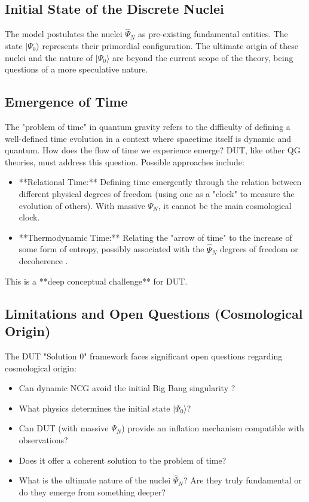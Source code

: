 \documentclass[11pt, a4paper]{article}
\theoremstyle{remark}
\newcommand{\Op}[1]{\hat{#1}}
\begin{document}
\subsection{Initial State of the Discrete Nuclei}
\label{subsec:initial_state_nuclei_final}
The model postulates the nuclei \( \hat{\Psi}_N \) as pre-existing fundamental entities. The state \( |\Psi_0\rangle \) represents their primordial configuration. The ultimate origin of these nuclei and the nature of \( |\Psi_0\rangle \) are beyond the current scope of the theory, being questions of a more speculative nature.

\subsection{Emergence of Time}
\label{subsec:time_emergence_final}
The "problem of time" in quantum gravity \citep{ProblemOfTimeRef} refers to the difficulty of defining a well-defined time evolution in a context where spacetime itself is dynamic and quantum. How does the flow of time we experience emerge? DUT, like other QG theories, must address this question. Possible approaches include:
\begin{itemize}
    \item **Relational Time:** Defining time emergently through the relation between different physical degrees of freedom (using one as a "clock" to measure the evolution of others). With massive \( \Psi_N \), it cannot be the main cosmological clock.
    \item **Thermodynamic Time:** Relating the "arrow of time" to the increase of some form of entropy, possibly associated with the \( \Op{\Psi}_N \) degrees of freedom or decoherence \citep{KieferQuantumGravityBook, Kiefer:2008sw}.
\end{itemize}
This is a **deep conceptual challenge** for DUT.

\subsection{Limitations and Open Questions (Cosmological Origin)}
\label{subsec:origin_limitations_final_revised}
The DUT "Solution 0" framework faces significant open questions regarding cosmological origin:
\begin{itemize}
    \item Can dynamic NCG avoid the initial Big Bang singularity \citep[cf.][]{Nicolini:2008aj}?
    \item What physics determines the initial state \( |\Psi_0\rangle \)?
    \item Can DUT (with massive \( \Psi_N \)) provide an inflation mechanism compatible with observations?
    \item Does it offer a coherent solution to the problem of time?
    \item What is the ultimate nature of the nuclei \( \hat{\Psi}_N \)? Are they truly fundamental or do they emerge from something deeper?
\end{itemize}
\end{document}
